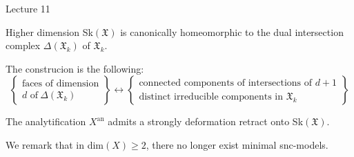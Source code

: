 \begin{section}{Lecture 11}
\begin{subsection}{Higher dimension}
Sk$(\mathfrak{X})$ is canonically homeomorphic to the dual intersection complex $\Delta(\mathfrak{X}_k)$ of $\mathfrak{X}_k$. 

The construcion is the following: 
\[
\left\{
\begin{array}{l}
\textrm{faces of dimension}\\
\textrm{$d$ of} \ \Delta(\mathfrak{X}_k) \end{array} \right\} \leftrightarrow  
\left\{ \begin{array}{l} \textrm{connected components of intersections of $d+1$}\\
\textrm{distinct irreducible components in $\mathfrak{X}_k$}
\end{array} \right\}
\]

\begin{theorem} The analytification $X^{\textrm{an}}$ admits a strongly deformation retract onto Sk$(\mathfrak{X})$. 
\end{theorem}

We remark that in dim$(X) \geq 2$, there no longer exist minimal snc-models. 
\end{subsection}
\end{section}
